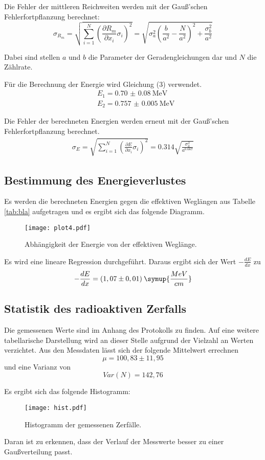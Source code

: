 Die Fehler der mittleren Reichweiten werden mit der Gauß'schen Fehlerfortpflanzung berechnet:
\begin{equation}
  \sigma_{R_m} = \sqrt{
      \sum\limits_{i = 1}^N
       \left( \frac{\partial R_m}{\partial x_i} \sigma_i \right)^{\!\! 2}
     } = \sqrt{\sigma_{a}^{2} \left(\frac{b}{a^{2}} - \frac{N}{a^{2}}\right)^{2} + \frac{\sigma_{b}^{2}}{a^{2}} }
\end{equation}

Dabei sind stellen $a$ und $b$ die Parameter der Geradengleichungen dar und $N$ die Zählrate.

Für die Berechnung der Energie wird Gleichung (3) verwendet.
\begin{align*}
  &E_1 = \SI{0.70(8)}{\mega\eV} \\
  &E_2 = \SI{0.757(5)}{\mega\eV}
\end{align*}

Die Fehler der berechneten Energien werden erneut mit der Gauß'schen Fehlerfortpflanzung berechnet.
\begin{align*}
  \sigma_{E} = \sqrt{
      \sum\limits_{i = 1}^N
       \left( \frac{\partial E}{\partial x_i} \sigma_i \right)^{\!\! 2}
     } = 0.314 \sqrt{\frac{\sigma_{a}^{2}}{a^{0.667}}}
\end{align*}


\subsection{Bestimmung des Energieverlustes}
Es werden die berechneten Energien gegen die effektiven Weglängen aus Tabelle \ref{tab:bla} aufgetragen und es ergibt sich das folgende Diagramm.
\begin{figure}[H]
  \centering
  \texttt{[image: plot4.pdf]}
  \caption{Abhängigkeit der Energie von der effektiven Weglänge.}
  \label{fig:plot4}
\end{figure}
Es wird eine lineare Regression durchgeführt. Daraus ergibt sich der Wert $-\frac{dE}{dx}$ zu
\begin{equation*}
  -\frac{dE}{dx} = (1,07 \pm 0,01) \: \symup{\frac{MeV}{cm}}
\end{equation*}

\subsection{Statistik des radioaktiven Zerfalls}
Die gemessenen Werte sind im Anhang des Protokolls zu finden. Auf eine weitere tabellarische
Darstellung wird an dieser Stelle aufgrund der Vielzahl an Werten verzichtet.
Aus den Messdaten lässt sich der folgende Mittelwert errechnen
\begin{equation*}
  \mu = 100,83 \pm 11,95
\end{equation*}
und eine Varianz von
\begin{equation*}
  Var(N) = 142,76
\end{equation*}

Es ergibt sich das folgende Histogramm:
\begin{figure}[H]
  \centering
  \texttt{[image: hist.pdf]}
  \caption{Histogramm der gemessenen Zerfälle.}
  \label{fig:hist}
\end{figure}

Daran ist zu erkennen, dass der Verlauf der Messwerte besser zu einer Gaußverteilung passt.
